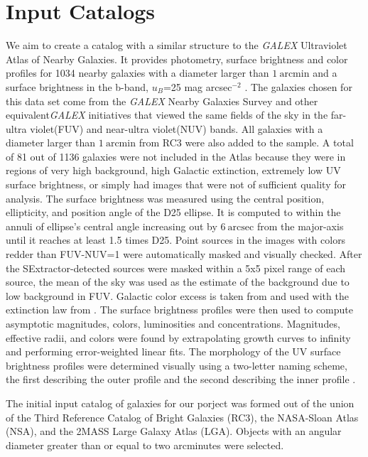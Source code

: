 \documentclass[12pt,preprint,pdftex]{aastex}
\newcommand{\units}[1]{\mathrm{#1}}
\renewcommand{\arcmin}{\units{arcmin}}
\renewcommand{\arcsec}{\units{arcsec}}
\begin{document}
\section{Input Catalogs}
We aim to create a catalog with a similar structure to the
\textit{GALEX} Ultraviolet Atlas of Nearby Galaxies. It provides
photometry, surface brightness and color profiles for 1034 nearby
galaxies with a diameter larger than $1~\arcmin$ and a surface
brightness in the b-band, $u_B$=25 mag arcsec$^{-2}$ . The galaxies
chosen for this data set come from the \textit{GALEX} Nearby Galaxies
Survey and other equivalent\textit{GALEX} initiatives that viewed the
same fields of the sky in the far-ultra violet(FUV) and near-ultra
violet(NUV) bands. All galaxies with a diameter larger than
$1~\arcmin$ from RC3 were also added to the sample. A total of 81 out
of 1136 galaxies were not included in the Atlas because they were in
regions of very high background, high Galactic extinction, extremely
low UV surface brightness, or simply had images that were not of
sufficient quality for analysis. The surface brightness was measured
using the central position, ellipticity, and position angle of the D25
ellipse. It is computed to within the annuli of ellipse's central
angle increasing out by $6~\arcsec$ from the major-axis until it
reaches at least 1.5 times D25. Point sources in the images with
colors redder than FUV-NUV=1 were automatically masked and visually
checked. After the SExtractor-detected sources were masked within a
5x5 pixel range of each source, the mean of the sky was used as the
estimate of the background due to low background in FUV. Galactic
color excess is taken from \cite{schlegel98} and used with the
extinction law from \cite{cardelli}. The surface brightness profiles
were then used to compute asymptotic magnitudes, colors, luminosities
and concentrations. Magnitudes, effective radii, and colors were found
by extrapolating growth curves to infinity and performing
error-weighted linear fits. The morphology of the UV surface
brightness profiles were determined visually using a two-letter naming
scheme, the first describing the outer profile and the second
describing the inner profile \citep{gdp06}.

The initial input catalog of galaxies for our porject was formed out of the union of the Third
Reference Catalog of Bright Galaxies (RC3), the NASA-Sloan Atlas
(NSA), and the 2MASS Large Galaxy Atlas (LGA). Objects with an angular
diameter greater than or equal to two arcminutes were selected. 
\end{document}
